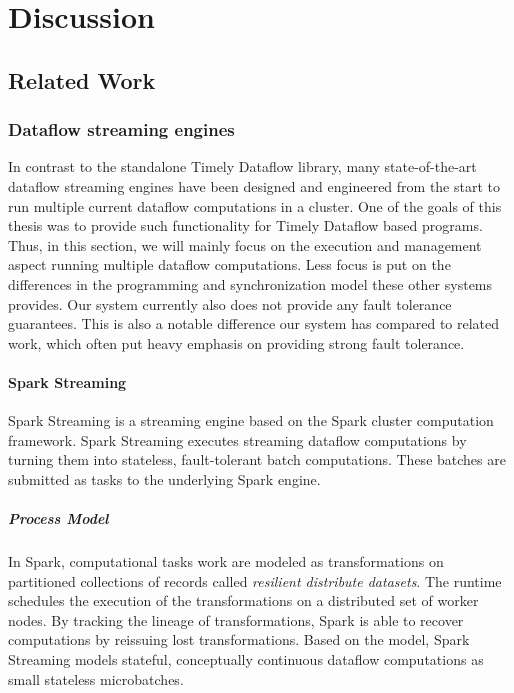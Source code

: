 \chapter{Discussion}\label{ch:discussion}

\section{Related Work}

\subsection{Dataflow streaming engines}

In contrast to the standalone Timely Dataflow library, many state-of-the-art
dataflow streaming engines have been designed and engineered from the start
to run multiple current dataflow computations in a cluster. One of the
goals of this thesis was to provide such functionality for Timely Dataflow
based programs. Thus, in this section, we will mainly focus on the execution
and management aspect running multiple dataflow computations. Less focus is
put on the differences in the programming and synchronization model these 
other systems provides. Our system currently also does not provide any fault
tolerance guarantees. This is also a notable difference our system has compared
to related work, which often put heavy emphasis on providing strong fault
tolerance.

\subsubsection{Spark Streaming}

Spark Streaming \cite{sparkstreaming} is a streaming engine based on the Spark
cluster computation framework. Spark Streaming executes streaming dataflow
computations by turning them into stateless, fault-tolerant batch computations.
These batches are submitted as tasks to the underlying Spark engine. \cite{spark} 

\paragraph{Process Model}

In Spark, computational tasks work are modeled as transformations on partitioned
collections of records called \emph{resilient distribute datasets}. The
runtime schedules the execution of the transformations on a distributed set of
worker nodes. By tracking the lineage of transformations, Spark is able to
recover computations by reissuing lost transformations. Based on the model,
Spark Streaming models stateful, conceptually continuous dataflow computations
as small stateless microbatches.

